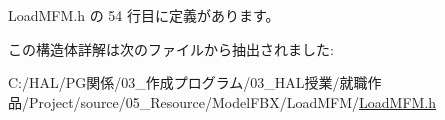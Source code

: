  Load\+M\+F\+M.\+h の 54 行目に定義があります。



この構造体詳解は次のファイルから抽出されました\+:\begin{DoxyCompactItemize}
\item 
C\+:/\+H\+A\+L/\+P\+G関係/03\+\_\+作成プログラム/03\+\_\+\+H\+A\+L授業/就職作品/\+Project/source/05\+\_\+\+Resource/\+Model\+F\+B\+X/\+Load\+M\+F\+M/\mbox{\hyperlink{_load_m_f_m_8h}{Load\+M\+F\+M.\+h}}\end{DoxyCompactItemize}
